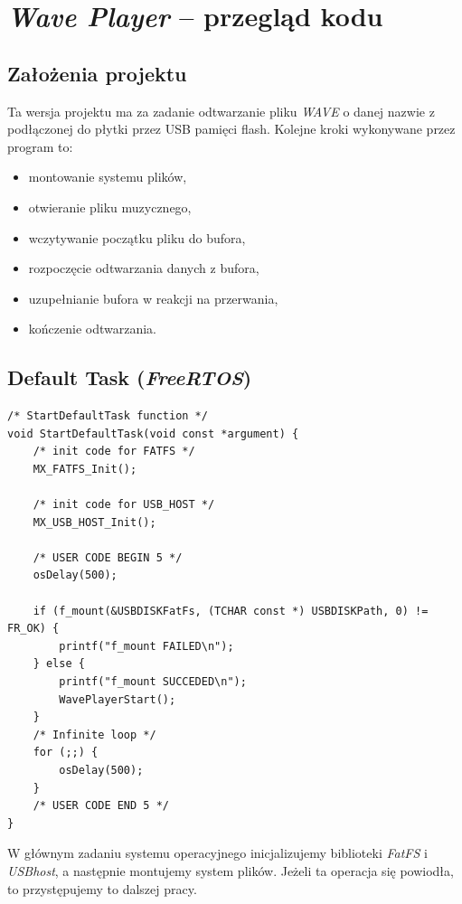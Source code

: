 \documentclass[12pt,a4paper]{article}
\begin{document}
\section{\emph{Wave Player} -- przegląd kodu}

\subsection{Założenia projektu}
Ta wersja projektu ma za zadanie odtwarzanie pliku \emph{WAVE} o danej nazwie z podłączonej do płytki przez USB pamięci flash. Kolejne kroki wykonywane przez program to:
\begin{itemize}
 \item montowanie systemu plików,
 \item otwieranie pliku muzycznego,
 \item wczytywanie początku pliku do bufora,
 \item rozpoczęcie odtwarzania danych z bufora,
 \item uzupełnianie bufora w reakcji na przerwania,
 \item kończenie odtwarzania.
\end{itemize}

\subsection{Default Task (\emph{FreeRTOS})}

\begin{lstlisting}
/* StartDefaultTask function */
void StartDefaultTask(void const *argument) {
    /* init code for FATFS */
    MX_FATFS_Init();

    /* init code for USB_HOST */
    MX_USB_HOST_Init();

    /* USER CODE BEGIN 5 */
    osDelay(500);

    if (f_mount(&USBDISKFatFs, (TCHAR const *) USBDISKPath, 0) != FR_OK) {
        printf("f_mount FAILED\n");
    } else {
        printf("f_mount SUCCEDED\n");
        WavePlayerStart();
    }
    /* Infinite loop */
    for (;;) {
        osDelay(500);
    }
    /* USER CODE END 5 */
}
\end{lstlisting}

W głównym zadaniu systemu operacyjnego inicjalizujemy biblioteki \emph{FatFS} i \emph{USBhost}, a następnie montujemy system plików. Jeżeli ta operacja się powiodła, to przystępujemy to dalszej pracy.
\end{document}
